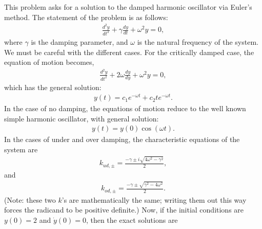 \documentclass[letter,12pt]{article}
\begin{document}
This problem asks for a solution to the damped harmonic oscillator via Euler's method. The statement of the problem is as follows:
\begin{align}
\frac{d^2 y}{dt^2} + \gamma \frac{dy}{dt} + \omega^2 y = 0,
\end{align}
where $\gamma$ is the damping parameter, and $\omega$ is the natural frequency of the system. We must be careful with the different cases. For the critically damped case, the equation of motion becomes,
\begin{align}
\frac{d^2 y}{dt^2} + 2\omega \frac{dy}{dy} + \omega^2 y = 0,
\end{align}
which has the general solution:
\begin{align}
y(t) = c_1 e^{-\omega t} + c_2 t e^{-\omega t}.
\end{align}
In the case of no damping, the equations of motion reduce to the well known simple harmonic oscillator, with general solution:
\begin{align}
y(t) = y(0) \cos(\omega t).
\end{align}
In the cases of under and over damping, the characteristic equations of the system are
\begin{align}
k_{ud,\pm} = \frac{-\gamma \pm i\sqrt{4\omega^2 - \gamma^2}}{2},
\end{align}
and
\begin{align}
 k_{od,\pm} = \frac{-\gamma \pm \sqrt{\gamma^2-4\omega^2}}{2}.
\end{align}
(Note: these two $k$'s are mathematically the same; writing them out this way forces the radicand to be positive definite.) Now, if the initial conditions are $y(0)=2$ and $\dot{y}(0)=0$, then the exact solutions are
\begin{enumerate}
\item{$\gamma = 0$: $y(t)=2\cos(\omega t)$}
\item{$\gamma = 2\omega$: $y(t) = 2 e^{-\omega t} (\omega t + 1)$}
\item{$\gamma < 2\omega = 2$: $y(t) = 2 e^{-t} \left(\cos(\frac{1}{2} t\sqrt{4\omega^2 - \gamma^2})+\frac{\gamma}{\sqrt{4\omega^2 - \gamma^2}}\sin(\frac{1}{2} t\sqrt{4\omega^2 - \gamma^2})\right)$
\item{$\gamma > 2\omega = 3$: $y(t) = 2 e^{-\frac{3t}{2}} \left(\cosh(\frac{1}{2} t\sqrt{\gamma^2-4\omega^2})+\frac{\gamma}{\sqrt{\gamma^2-4\omega^2}}\sinh(\frac{1}{2} t\sqrt{\gamma^2-4\omega^2})\right)$
\end{enumerate}
\end{document}

